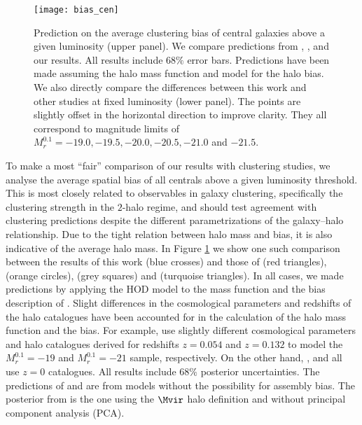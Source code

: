 \documentclass[fleqn,usenatbib,useAMS]{mnras}
\begin{document}
\begin{figure}
	\centering
	\texttt{[image: bias\_cen]}
	\caption{Prediction on the average clustering bias of central galaxies above a given luminosity (upper panel). We compare predictions from \protect\cite{Guo+15b}, \protect\cite{Vakili+16}, \protect\cite{Sinha+17} and our results. All results include $68\%$ error bars. Predictions have been made assuming the \protect\cite{Tinker+08} halo mass function and \protect\cite{Tinker+10} model for the halo bias. We also directly compare the differences between this work and other studies at fixed luminosity (lower panel). The points are slightly offset in the horizontal direction to improve clarity. They all correspond to magnitude limits of $M_r^{0.1} = -19.0, -19.5, -20.0, -20.5, -21.0$ and $-21.5$.}
	\label{fig:bias_cen}
\end{figure}

To make a most ``fair'' comparison of our results with clustering studies, we analyse the average spatial bias of all centrals above a given luminosity threshold. This is most closely related to observables in galaxy clustering, specifically the clustering strength in the $2$-halo regime, and should test agreement with clustering predictions despite the different parametrizations of the galaxy--halo relationship. Due to the tight relation between halo mass and bias, it is also indicative of the average halo mass. In Figure \ref{fig:bias_cen} we show one such comparison between the results of this work (blue crosses) and those of \cite{Guo+15b} (red triangles), \cite{Zentner+16} (orange circles), \cite{Vakili+16} (grey squares) and \cite{Sinha+17} (turquoise triangles). In all cases, we made predictions by applying the HOD model to the \cite{Tinker+08} mass function and the bias description of \cite{Tinker+10}. Slight differences in the cosmological parameters and redshifts of the halo catalogues have been accounted for in the calculation of the halo mass function and the bias. For example, \cite{Sinha+17} use slightly different cosmological parameters and halo catalogues derived for redshifts $z = 0.054$ and $z = 0.132$ to model the $M_r^{0.1} = -19$ and $M_r^{0.1} = -21$ sample, respectively. On the other hand, \cite{Guo+15b}, \cite{Zentner+16} and \cite{Vakili+16} all use $z = 0$ catalogues. All results include $68\%$ posterior uncertainties. The predictions of \cite{Zentner+16} and \cite{Vakili+16} are from models without the possibility for assembly bias. The posterior from \cite{Sinha+17} is the one using the $\Mvir$ halo definition and without principal component analysis (PCA).
\end{document}
